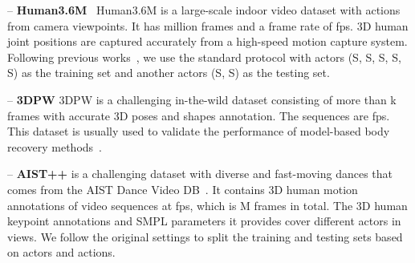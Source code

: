 \documentclass[runningheads]{llncs}
\begin{document}
\noindent -- \textbf{Human3.6M}~\cite{ionescu2013human3} Human3.6M is a large-scale indoor video dataset with  actions from  camera viewpoints. It has  million frames and a frame rate of  fps. 3D human joint positions are captured accurately from a high-speed motion capture system. Following previous works~\cite{zeng2020srnet,martinez2017simple,pavllo20193d,zeng2021smoothnet}, we use the standard protocol with  actors (S, S, S, S, S) as the training set and another  actors (S, S) as the testing set. 

\noindent -- \textbf{3DPW} \cite{von2018recovering} 3DPW is a challenging in-the-wild dataset consisting of more than k frames with accurate 3D poses and shapes annotation. The sequences are fps. This dataset is usually used to validate the performance of model-based body recovery methods~\cite{kanazawa2018hmr,kolotouros2019spin,joo2020eft,kocabas2021pare}.


\noindent -- \textbf{AIST++} \cite{li2021aist} is a challenging dataset with diverse and fast-moving dances that comes from the AIST Dance Video DB~\cite{tsuchida2019aist}. It contains 3D human motion annotations of  video sequences at  fps, which is M frames in total. The 3D human keypoint annotations and SMPL parameters it provides cover  different actors in  views. We follow the original settings to split the training and testing sets based on actors and actions.
\end{document}
